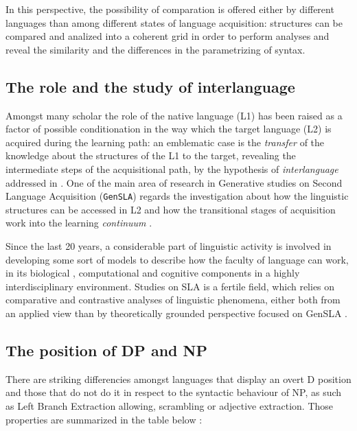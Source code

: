 \documentclass[a4paper,twoside,12pt,chapterprefix=false,listof=flat]{scrartcl}
\theoremstyle{plain} %
\theoremstyle{definition}
\theoremstyle{remark}
\begin{document}
In this perspective, the possibility of comparation is offered either by
different languages than among different states of language acquisition:
structures can be compared and analized into a coherent grid in order to
perform analyses and reveal the similarity and the differences in the
parametrizing of syntax.

\hypertarget{the-role-and-the-study-of-interlanguage}{%
\subsection{The role and the study of
interlanguage}\label{the-role-and-the-study-of-interlanguage}}

Amongst many scholar the role of the native language (L1) has been
raised as a factor of possible conditionation in the way which the
target language (L2) is acquired during the learning path: an emblematic
case is the \emph{transfer} of the knowledge about the structures of the
L1 to the target, revealing the intermediate steps of the acquisitional
path, by the hypothesis of \emph{interlanguage} addressed in
\citep{selinker1972}. One of the main area of research in Generative
studies on Second Language Acquisition (\texttt{GenSLA}) regards the
investigation about how the linguistic structures can be accessed in L2
and how the transitional stages of acquisition work into the learning
\emph{continuum} \citep{rothmanslabakova2017}.

Since the last 20 years, a considerable part of linguistic activity is
involved in developing some sort of models to describe how the faculty
of language can work, in its biological \citep{hcf2002}, computational
\citep{fodor2001} and cognitive components in a highly interdisciplinary
environment. Studies on SLA is a fertile field, which relies on
comparative and contrastive analyses of linguistic phenomena, either
both from an applied view \citep{ellis1994} than by theoretically
grounded perspective focused on GenSLA
\citep{guasti2002, hawkins2001, rothmanslabakova2017, sorace2011}.

\hypertarget{the-position-of-dp-and-np}{%
\subsection{The position of DP and NP}\label{the-position-of-dp-and-np}}

There are striking differencies amongst languages that display an overt
D position and those that do not do it in respect to the syntactic
behaviour of NP, as such as Left Branch Extraction allowing, scrambling
or adjective extraction. Those properties are summarized in the table
below \citep[in][ from \citet{boskovic2009}]{salzmann2018}:
\end{document}
